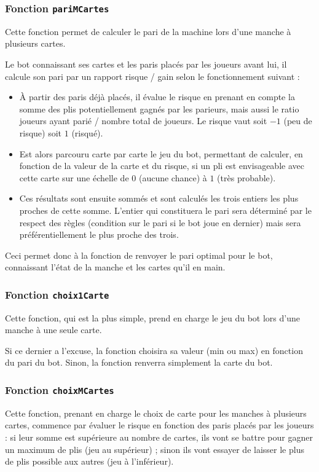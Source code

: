       \subsubsection{Fonction \texttt{pariMCartes}}
         Cette fonction permet de calculer le pari de la machine lors d'une manche à plusieurs cartes.

         Le bot connaissant ses cartes et les paris placés par les joueurs avant lui, il calcule son pari par un rapport risque / gain selon le fonctionnement suivant :
         \begin{itemize}
            \item À partir des paris déjà placés, il évalue le risque en prenant en compte la somme des plis potentiellement gagnés par les parieurs, mais aussi le ratio joueurs ayant parié / nombre total de joueurs.
            Le risque vaut soit $-1$ (peu de risque) soit $1$ (risqué).
            \item Est alors parcouru carte par carte le jeu du bot, permettant de calculer, en fonction de la valeur de la carte et du risque, si un pli est envisageable avec cette carte sur une échelle de $0$ (aucune chance) à $1$ (très probable).
            \item Ces résultats sont ensuite sommés et sont calculés les trois entiers les plus proches de cette somme.
            L'entier qui constituera le pari sera déterminé par le respect des règles (condition sur le pari si le bot joue en dernier) mais sera préférentiellement le plus proche des trois.
         \end{itemize}
         Ceci permet donc à la fonction de renvoyer le pari optimal pour le bot, connaissant l'état de la manche et les cartes qu'il en main.

      \subsubsection{Fonction \texttt{choix1Carte}}
         Cette fonction, qui est la plus simple, prend en charge le jeu du bot lors d'une manche à une seule carte.
         
         Si ce dernier a l'excuse, la fonction choisira sa valeur (min ou max) en fonction du pari du bot.
         Sinon, la fonction renverra simplement la carte du bot.
         
      \subsubsection{Fonction \texttt{choixMCartes}}
         Cette fonction, prenant en charge le choix de carte pour les manches à plusieurs cartes, commence par évaluer le risque en fonction des paris placés par les joueurs : si leur somme est supérieure au nombre de cartes, ils vont se battre pour gagner un maximum de plis (jeu au supérieur) ;
         sinon ils vont essayer de laisser le plus de plis possible aux autres (jeu à l'inférieur).

